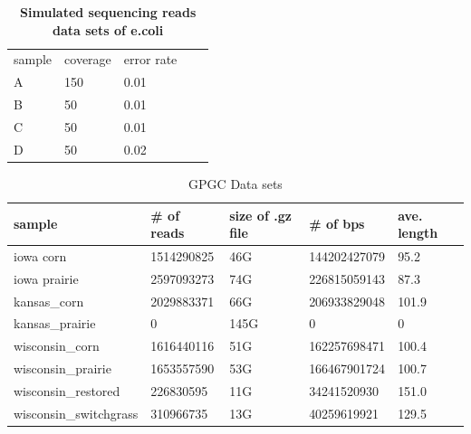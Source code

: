 \begin{table}[h]
\caption{
\bf{Simulated sequencing reads data sets of e.coli}
}
\begin{tabular}{|l|l|l|ll}
\cline{1-3}
sample & coverage & error rate &  &  \\ \cline{1-3}
A      & 150      & 0.01       &  &  \\ \cline{1-3}
B      & 50       & 0.01       &  &  \\ \cline{1-3}
C      & 50       & 0.01       &  &  \\ \cline{1-3}
D      & 50       & 0.02       &  &  \\ \cline{1-3}
\end{tabular}
\label{table:ecoli}
\end{table}



\begin{table}[h]
\caption{GPGC Data sets}
\label{my-label}
\begin{tabular}{|l|l|l|l|l|}
\hline
sample & \# of reads & size of .gz file & \# of bps & ave. length \\ \hline
iowa corn & 1514290825 & 46G & 144202427079 & 95.2 \\ \hline
iowa prairie & 2597093273 & 74G & 226815059143 & 87.3 \\ \hline
kansas\_corn & 2029883371 & 66G & 206933829048 & 101.9 \\ \hline
kansas\_prairie & 0 & 145G & 0 & 0 \\ \hline
wisconsin\_corn & 1616440116 & 51G & 162257698471 & 100.4 \\ \hline
wisconsin\_prairie & 1653557590 & 53G & 166467901724 & 100.7 \\ \hline
wisconsin\_restored & 226830595 & 11G & 34241520930 & 151.0 \\ \hline
wisconsin\_switchgrass & 310966735 & 13G & 40259619921 & 129.5 \\ \hline
\end{tabular}
\end{table}


